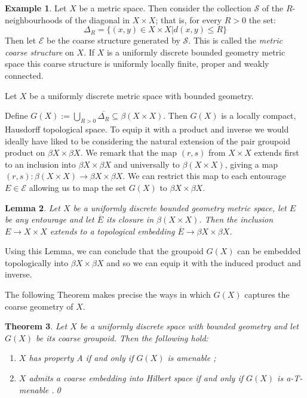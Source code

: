 \documentclass[preprint]{elsarticle}
\theoremstyle{plain}
\newtheorem{theorem}{Theorem}%
\newtheorem{lemma}[theorem]{Lemma}%
\theoremstyle{definition}%
\newtheorem{example}[theorem]{Example}%
\theoremstyle{remark}%
\begin{document}
\begin{example}\label{ex:MCS}
Let $X$ be a metric space. Then consider the collection $\mathcal{S}$ of the $R$-neighbourhoods of the diagonal in $X\times X$; that is, for every $R>0$ the set:
\begin{equation*}
\Delta_{R}=\lbrace (x,y) \in X \times X | d(x,y)\leq R \rbrace
\end{equation*}
Then let $\mathcal{E}$ be the coarse structure generated by $\mathcal{S}$. This is called the \textit{metric coarse structure} on $X$. If  $X$ is a uniformly discrete bounded geometry  metric space this coarse structure is uniformly locally finite, proper and weakly connected.
\end{example}

Let $X$ be a uniformly discrete metric space with bounded geometry. 

Define $G(X):=\bigcup_{R>0}\overline{\Delta_{R}} \subseteq \beta(X\times X)$. Then $G(X)$ is a locally compact, Hausdorff topological space. To equip it with a product and inverse we would ideally have liked to be considering the natural extension of the pair groupoid product on $\beta X \times \beta X$.  We remark that the map $(r,s)$ from $X \times X$ extends first to an inclusion into $\beta X \times \beta X$ and universally to $\beta( X \times X)$, giving a map $(r,s): \beta (X\times X) \rightarrow \beta X \times \beta X$. We can restrict this map to each entourage $E \in \mathcal{E}$ allowing us to map the set $G(X)$ to $\beta X \times \beta X$. 

\begin{lemma}\label{Lem:CorRoe}\cite[Corollary 10.18]{MR2007488}
Let $X$ be a uniformly discrete bounded geometry metric space, let $E$ be any entourage and let $\overline{E}$ its closure in $\beta(X \times X)$. Then the inclusion $E \rightarrow X \times X$ extends to a topological embedding $\overline{E} \rightarrow \beta X \times \beta X$.
\end{lemma}

Using this Lemma, we can conclude that the groupoid $G(X)$ can be embedded topologically into $\beta X \times \beta X$ and so we can equip it with the induced product and inverse.

The following Theorem makes precise the ways in which $G(X)$ captures the coarse geometry of $X$.

\begin{theorem}\label{thm:coarseprop}
Let $X$ be a uniformly discrete space with bounded geometry and let $G(X)$ be its coarse groupoid. Then the following hold:
\begin{enumerate}
\item $X$ has property A if and only if $G(X)$ is amenable \cite[Theorem 5.3]{MR1905840};
\item $X$ admits a coarse embedding into Hilbert space if and only if $G(X)$ is a-T-menable \cite[Theorem 5.4]{MR1905840}.\qed
\end{enumerate}
\end{theorem}
\end{document}
